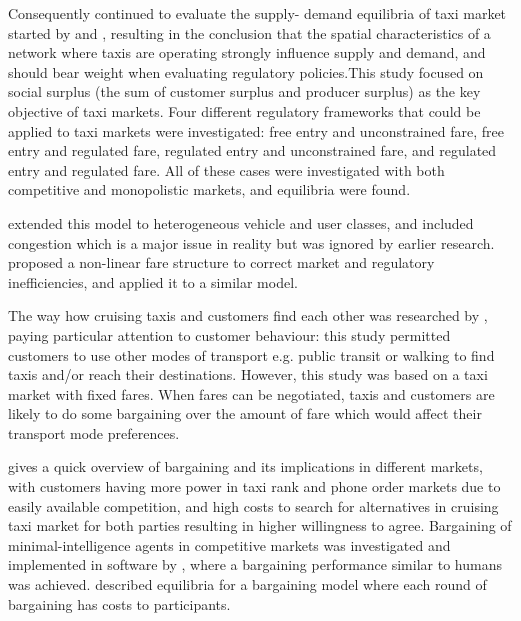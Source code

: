 Consequently \textcite{Yang2002taxi+demand} continued to evaluate the supply-
demand equilibria of taxi market started by \textcite{Yang1998taxi+network} and
\textcite{Yang2000taxi+utilization}, resulting in the conclusion that the
spatial characteristics of a network where taxis are operating strongly
influence supply and demand, and should bear weight when evaluating regulatory
policies.This study focused on social surplus (the sum of customer surplus and
producer surplus) as the key objective of taxi markets. Four different
regulatory frameworks that could be applied to taxi markets were investigated:
free entry and unconstrained fare, free entry and regulated fare, regulated
entry and unconstrained fare, and regulated entry and regulated fare. All of
these cases were investigated with both competitive and monopolistic markets,
and equilibria were found.

\textcite{Wong2008taxi+modeling} extended this model to heterogeneous vehicle
and user classes, and included congestion which is a major issue in reality but
was ignored by earlier research. \textcite{Yang2010taxi+nonlinear} proposed a
non-linear fare structure to correct market and regulatory inefficiencies, and
applied it to a similar model.

The way how cruising taxis and customers find each other was researched by
\textcite{Yang2010taxi+equilibria}, paying particular attention to customer
behaviour: this study permitted customers to use other modes of transport e.g.
public transit or walking to find taxis and/or reach their destinations.
However, this study was based on a taxi market with fixed fares. When fares can
be negotiated, taxis and customers are likely to do some bargaining over the
amount of fare which would affect their transport mode preferences.

\textcite{Cairns1996taxi+competition} gives a quick overview of bargaining and
its implications in different markets, with customers having more power in taxi
rank and phone order markets due to easily available competition, and high
costs to search for alternatives in cruising taxi market for both parties
resulting in higher willingness to agree. Bargaining of minimal-intelligence
agents in competitive markets was investigated and implemented in software by
\textcite{Cli1997taxi+bargaining}, where a bargaining performance similar to
humans was achieved. \textcite{Rubinstein1982taxi+bargaining} described
equilibria for a bargaining model where each round of bargaining has costs to
participants.


